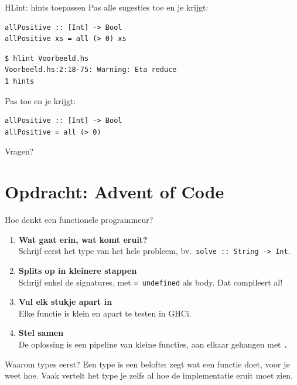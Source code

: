 \documentclass[aspectratio=169,11pt]{beamer}
\newcommand{\hs}{\lstinline[style=hsinline]}
\begin{document}
\begin{frame}[fragile]{HLint: hints toepassen}
  Pas alle sugesties toe en je krijgt:
\begin{lstlisting}
allPositive :: [Int] -> Bool
allPositive xs = all (> 0) xs
\end{lstlisting}

\begin{lstlisting}[language={}]
$ hlint Voorbeeld.hs
Voorbeeld.hs:2:18-75: Warning: Eta reduce
1 hints
\end{lstlisting}

Pas toe en je krijgt:

\begin{lstlisting}
allPositive :: [Int] -> Bool
allPositive = all (> 0)
\end{lstlisting}
\end{frame}

\begin{frame}[standout]
  Vragen?
\end{frame}

\section{Opdracht: Advent of Code}

\begin{frame}{Hoe denkt een functionele programmeur?}
  \begin{enumerate}
    \item \textbf{Wat gaat erin, wat komt eruit?}\\
      Schrijf eerst het type van het \alert{hele} probleem, bv.\ \hs|solve :: String -> Int|.
    \item \textbf{Splits op in kleinere stappen}\\
      Schrijf enkel de \alert{signatures}, met \hs|= undefined| als body. Dat compileert al!
    \item \textbf{Vul elk stukje apart in}\\
      Elke functie is klein en apart te testen in GHCi.
    \item \textbf{Stel samen}\\
      De oplossing is een \alert{pipeline} van kleine functies, aan elkaar gehangen met \hs|.|
  \end{enumerate}
  \pause
  \begin{block}{Waarom types eerst?}
    Een type is een \alert{belofte}: zegt wat een functie doet, voor je weet hoe.
    Vaak vertelt het type je zelfs al hoe de implementatie eruit moet zien.
  \end{block}
\end{frame}
\end{document}
